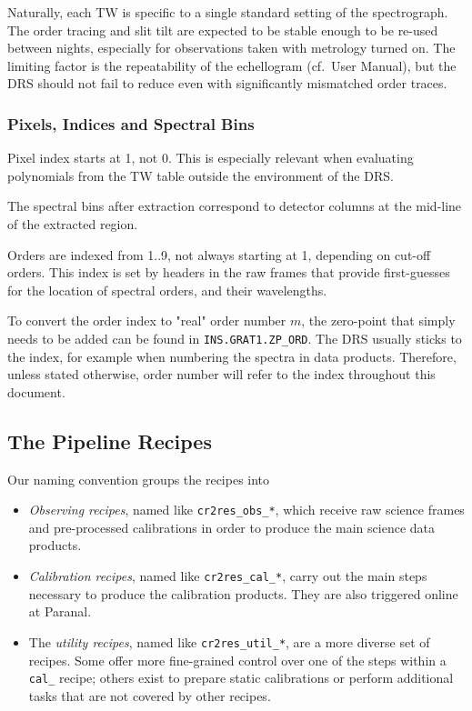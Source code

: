 Naturally, each TW is specific to a single standard setting of the spectrograph.
The order tracing and slit tilt are expected to be stable enough to be re-used
between nights, especially for observations taken with metrology turned on. The
limiting factor is the repeatability of the echellogram (cf.~User Manual), but
the DRS should not fail to reduce even with significantly mismatched order
traces.

\subsubsection{Pixels, Indices and Spectral Bins}
Pixel index starts at 1, not 0. This is especially relevant when evaluating
polynomials from the TW table outside the environment of the DRS.

The spectral bins after extraction correspond to detector columns at the
mid-line of the extracted region.

Orders are indexed from 1..9, not always starting at 1, depending on cut-off
orders. This index is set by headers in the raw frames that provide first-guesses
for the location of spectral orders, and their wavelengths.

To convert the order index to "real" order number $m$, the zero-point that
simply needs to be added can be found in \texttt{INS.GRAT1.ZP\_ORD}. The DRS
usually sticks to the index, for example when numbering the spectra in data
products. Therefore, unless stated otherwise, order number will refer to the
index throughout this document.

\subsection{The Pipeline Recipes}
\label{sec:recipes-quick}

Our naming convention groups the recipes into
\begin{itemize}
    \item \textit{Observing recipes}, named like \texttt{cr2res\_obs\_*}, which
    receive raw science frames and pre-processed calibrations in order to
    produce the main science data products.
    \item \textit{Calibration recipes}, named like \texttt{cr2res\_cal\_*},
    carry out the main steps necessary to produce the calibration products. They
    are also triggered online at Paranal.
    \item The \textit{utility recipes}, named like \texttt{cr2res\_util\_*}, are
    a more diverse set of recipes. Some offer more fine-grained control over one
    of the steps within a \texttt{cal\_} recipe; others exist to prepare static
    calibrations or perform additional tasks that are not covered by other
    recipes.
\end{itemize}

